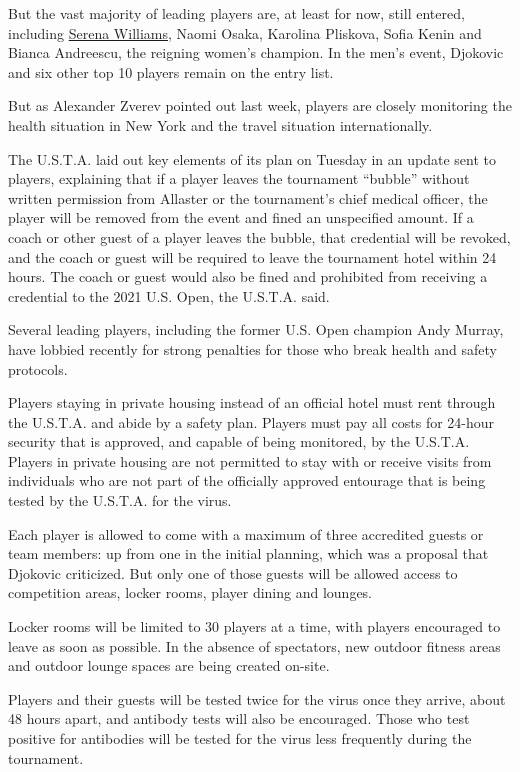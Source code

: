 But the vast majority of leading players are, at least for now, still
entered, including
\href{https://www.nytimes3xbfgragh.onion/2020/06/17/sports/tennis/serena-williams-us-open.html}{Serena
Williams}, Naomi Osaka, Karolina Pliskova, Sofia Kenin and Bianca
Andreescu, the reigning women's champion. In the men's event, Djokovic
and six other top 10 players remain on the entry list.

But as Alexander Zverev pointed out last week, players are closely
monitoring the health situation in New York and the travel situation
internationally.

The U.S.T.A. laid out key elements of its plan on Tuesday in an update
sent to players, explaining that if a player leaves the tournament
``bubble'' without written permission from Allaster or the tournament's
chief medical officer, the player will be removed from the event and
fined an unspecified amount. If a coach or other guest of a player
leaves the bubble, that credential will be revoked, and the coach or
guest will be required to leave the tournament hotel within 24 hours.
The coach or guest would also be fined and prohibited from receiving a
credential to the 2021 U.S. Open, the U.S.T.A. said.

Several leading players, including the former U.S. Open champion Andy
Murray, have lobbied recently for strong penalties for those who break
health and safety protocols.

Players staying in private housing instead of an official hotel must
rent through the U.S.T.A. and abide by a safety plan. Players must pay
all costs for 24-hour security that is approved, and capable of being
monitored, by the U.S.T.A. Players in private housing are not permitted
to stay with or receive visits from individuals who are not part of the
officially approved entourage that is being tested by the U.S.T.A. for
the virus.

Each player is allowed to come with a maximum of three accredited guests
or team members: up from one in the initial planning, which was a
proposal that Djokovic criticized. But only one of those guests will be
allowed access to competition areas, locker rooms, player dining and
lounges.

Locker rooms will be limited to 30 players at a time, with players
encouraged to leave as soon as possible. In the absence of spectators,
new outdoor fitness areas and outdoor lounge spaces are being created
on-site.

Players and their guests will be tested twice for the virus once they
arrive, about 48 hours apart, and antibody tests will also be
encouraged. Those who test positive for antibodies will be tested for
the virus less frequently during the tournament.

